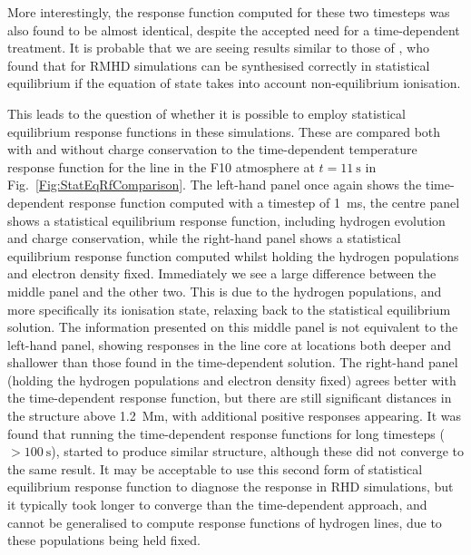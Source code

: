 More interestingly, the \Ha{} response function computed for these two timesteps was also found to be almost identical, despite the accepted need for a time-dependent treatment.
It is probable that we are seeing results similar to those of \citet{Leenaarts2012a}, who found that for RMHD simulations \Ha{} can be synthesised correctly in statistical equilibrium if the equation of state takes into account non-equilibrium ionisation.

This leads to the question of whether it is possible to employ statistical equilibrium response functions in these simulations.
These are compared both with and without charge conservation to the time-dependent temperature response function for the \CaLine{} line in the F10 atmosphere at $t=\SI{11}{\s}$ in Fig.~\ref{Fig:StatEqRfComparison}.
The left-hand panel once again shows the time-dependent response function computed with a timestep of \SI{1}{\milli\s}, the centre panel shows a statistical equilibrium response function, including hydrogen evolution and charge conservation, while the right-hand panel shows a statistical equilibrium response function computed whilst holding the hydrogen populations and electron density fixed.
Immediately we see a large difference between the middle panel and the other two.
This is due to the hydrogen populations, and more specifically its ionisation state, relaxing back to the statistical equilibrium solution.
The information presented on this middle panel is not equivalent to the left-hand panel, showing responses in the line core at locations both deeper and shallower than those found in the time-dependent solution.
The right-hand panel (holding the hydrogen populations and electron density fixed) agrees better with the time-dependent response function, but there are still significant distances in the structure above \SI{1.2}{\mega\metre}, with additional positive responses appearing.
It was found that running the time-dependent response functions for long timesteps ($>\SI{100}{\s}$), started to produce similar structure, although these did not converge to the same result.
It may be acceptable to use this second form of statistical equilibrium response function to diagnose the \CaLine{} response in RHD simulations, but it typically took longer to converge than the time-dependent approach, and cannot be generalised to compute response functions of hydrogen lines, due to these populations being held fixed.

